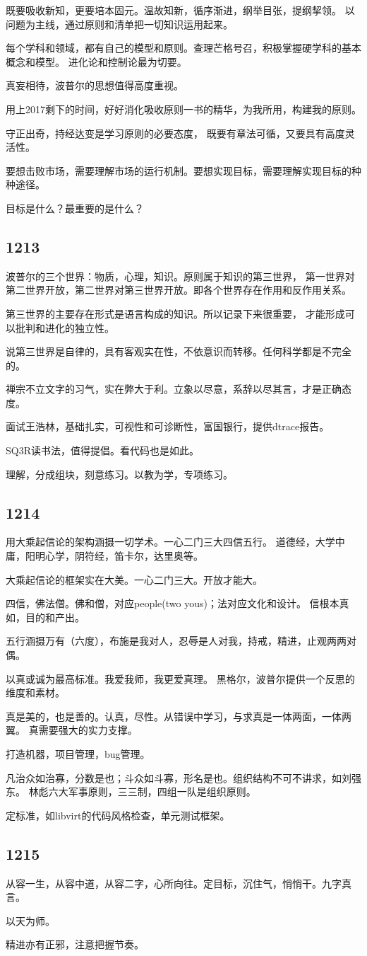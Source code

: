 既要吸收新知，更要培本固元。温故知新，循序渐进，纲举目张，提纲挈领。
以问题为主线，通过原则和清单把一切知识运用起来。

每个学科和领域，都有自己的模型和原则。查理芒格号召，积极掌握硬学科的基本概念和模型。
进化论和控制论最为切要。

真妄相待，波普尔的思想值得高度重视。

用上2017剩下的时间，好好消化吸收原则一书的精华，为我所用，构建我的原则。

守正出奇，持经达变是学习原则的必要态度，
既要有章法可循，又要具有高度灵活性。

要想击败市场，需要理解市场的运行机制。要想实现目标，需要理解实现目标的种种途径。

目标是什么？最重要的是什么？

\subsection{1213}

波普尔的三个世界：物质，心理，知识。原则属于知识的第三世界，
第一世界对第二世界开放，第二世界对第三世界开放。即各个世界存在作用和反作用关系。

第三世界的主要存在形式是语言构成的知识。所以记录下来很重要，
才能形成可以批判和进化的独立性。

说第三世界是自律的，具有客观实在性，不依意识而转移。任何科学都是不完全的。

禅宗不立文字的习气，实在弊大于利。立象以尽意，系辞以尽其言，才是正确态度。

面试王浩林，基础扎实，可视性和可诊断性，富国银行，提供dtrace报告。

SQ3R读书法，值得提倡。看代码也是如此。

理解，分成组块，刻意练习。以教为学，专项练习。

\subsection{1214}

用大乘起信论的架构涵摄一切学术。一心二门三大四信五行。
道德经，大学中庸，阳明心学，阴符经，笛卡尔，达里奥等。

大乘起信论的框架实在大美。一心二门三大。开放才能大。

四信，佛法僧。佛和僧，对应people(two yous)；法对应文化和设计。
信根本真如，目的和产出。

五行涵摄万有（六度），布施是我对人，忍辱是人对我，持戒，精进，止观两两对偶。

以真或诚为最高标准。我爱我师，我更爱真理。
黑格尔，波普尔提供一个反思的维度和素材。

真是美的，也是善的。认真，尽性。从错误中学习，与求真是一体两面，一体两翼。
真需要强大的实力支撑。

打造机器，项目管理，bug管理。

凡治众如治寡，分数是也；斗众如斗寡，形名是也。组织结构不可不讲求，如刘强东。
林彪六大军事原则，三三制，四组一队是组织原则。

定标准，如libvirt的代码风格检查，单元测试框架。

\subsection{1215}

从容一生，从容中道，从容二字，心所向往。定目标，沉住气，悄悄干。九字真言。

以天为师。

精进亦有正邪，注意把握节奏。
